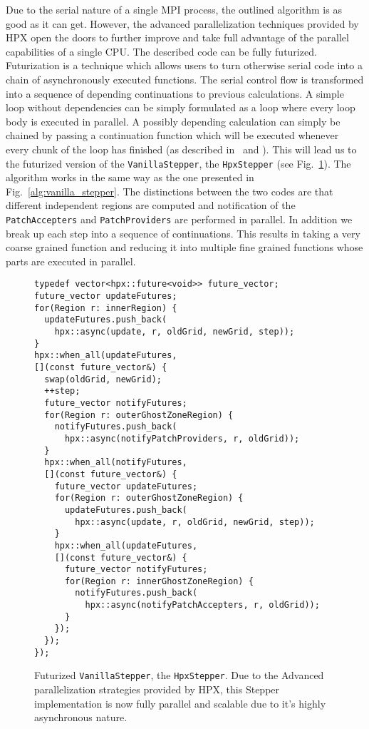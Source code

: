\documentclass{sig-alternate}
\newcommand{\ctype}[1]{\texttt{{{#1}}}}
\newcommand{\upp}{\vspace*{-0.5em}}
\newcommand{\up}{\vspace*{-0.25em}}
\begin{document}
Due to the serial nature of a single MPI process, the outlined algorithm is as
good as it can get. However, the advanced parallelization techniques provided by
HPX open the doors to further improve and take full advantage of the parallel
capabilities of a single CPU. The described code can be fully futurized.
Futurization is a technique which allows users to turn otherwise serial code into a
chain of asynchronously executed functions. The serial control flow is
transformed into a sequence of depending continuations to previous calculations.
A simple loop without dependencies can be simply formulated as a loop where every
loop body is executed in parallel. A possibly depending calculation can simply be
chained by passing a continuation function which will be executed whenever every
chunk of the loop has finished (as described in~\cite{cxx11_n3634} and \cite{cxx11_n3722}).
This will lead us to the futurized version of the \ctype{VanillaStepper}, the
\ctype{HpxStepper} (see Fig.~\ref{alg:futurized_stepper}). The algorithm works in
the same way as the one presented in Fig.~\ref{alg:vanilla_stepper}. The
distinctions between the two codes are that different independent regions are computed and
notification of the \ctype{PatchAccepters} and \ctype{PatchProviders} are performed in parallel.  In
addition we break up each step into a sequence of continuations. This results in taking
a very coarse grained function and reducing it into multiple fine grained functions
whose parts are executed in parallel.
\begin{figure}[ht]
    \begin{lstlisting}
typedef vector<hpx::future<void>> future_vector;
future_vector updateFutures;
for(Region r: innerRegion) {
  updateFutures.push_back(
    hpx::async(update, r, oldGrid, newGrid, step));
}
hpx::when_all(updateFutures,
[](const future_vector&) {
  swap(oldGrid, newGrid);
  ++step;
  future_vector notifyFutures;
  for(Region r: outerGhostZoneRegion) {
    notifyFutures.push_back(
      hpx::async(notifyPatchProviders, r, oldGrid));
  }
  hpx::when_all(notifyFutures,
  [](const future_vector&) {
    future_vector updateFutures;
    for(Region r: outerGhostZoneRegion) {
      updateFutures.push_back(
        hpx::async(update, r, oldGrid, newGrid, step));
    }
    hpx::when_all(updateFutures,
    [](const future_vector&) {
      future_vector notifyFutures;
      for(Region r: innerGhostZoneRegion) {
        notifyFutures.push_back(
          hpx::async(notifyPatchAccepters, r, oldGrid));
      }
    });
  });
});
    \end{lstlisting}
    \upp\upp
    \caption{Futurized \ctype{VanillaStepper}, the \ctype{HpxStepper}. Due to the
    Advanced parallelization strategies provided by HPX, this Stepper implementation
    is now fully parallel and scalable due to it's highly asynchronous nature.}
    \label{alg:futurized_stepper}
    \upp
    \upp
    \upp
    \upp
\end{figure}
\end{document}

